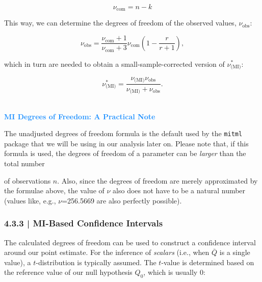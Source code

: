 \begin{equation}
\nu_{\text{com}} = n-k
\end{equation}

This way, we can determine the degrees of freedom of the observed values, $\nu_{\text{obs}}$:

\begin{equation}
\nu_\text{obs} = \frac{\nu_\text{com}+1}{\nu_\text{com}+3}\nu_\text{com}\left(1-\frac{r}{r+1}\right),
\end{equation}

which in turn are needed to obtain a small-sample-corrected version of $\nu^*_{\text{(MI)}}$:

\begin{equation}
\nu^*_{\text{(MI)}} =
  \frac{\nu_{\text{(MI)}} \nu_\text{obs}}
  {\nu_{\text{(MI)}}+\nu_\text{obs}}.
\end{equation}


\begin{box-info} \\
\textcolor{dodgerblue}{\textbf{MI Degrees of Freedom: A Practical Note}} 

\vspace{2mm}

The unadjusted degrees of freedom formula is the default used by the \texttt{mitml} package that we will be using in our analysis later on. Please note that, if this formula is used, the degrees of freedom of a parameter can be \emph{larger} than the total number
\end{box-info}

\begin{box-info-continued}

of observations $n$. Also, since the degrees of freedom are merely approximated by the formulae above, the value of $\nu$ also does not have to be a natural number (values like, e.g., $\nu$=256.5669 are also perfectly possible).
\end{box-info-continued}

\subsubsection{{\normalfont\textsf{\textcolor{sBlue}{\small 4.3.3 |}}} MI-Based Confidence Intervals}

The calculated degrees of freedom can be used to construct a confidence interval around our point estimate. For the inference of \emph{scalars} (i.e., when $\bar Q$ is a single value), a $t$-distribution is typically assumed. The $t$-value is determined based on the reference value of our null hypothesis $Q_0$, which is usually 0:


